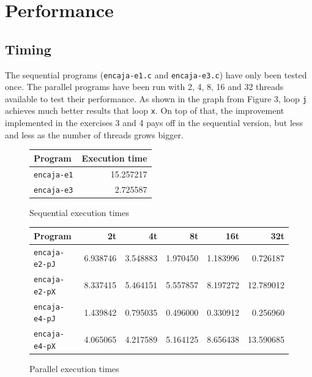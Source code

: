 \documentclass[a4paper]{article}
\begin{document}
\section{Performance}

\subsection{Timing}
The sequential programs (\texttt{encaja-e1.c} and \texttt{encaja-e3.c}) have only been tested once. The parallel programs have been run with 2, 4, 8, 16 and 32 threads available to test their performance. As shown in the graph from Figure 3, loop \texttt{j} achieves much better results that loop \texttt{x}. On top of that, the improvement implemented in the exercises 3 and 4 pays off in the sequential version, but less and less as the number of threads grows bigger.

\begin{figure}[h]
    \centering
    \begin{tabular}{l r}
        Program            & Execution time \\ \hline
        \texttt{encaja-e1} & 15.257217      \\
        \texttt{encaja-e3} &  2.725587      \\
    \end{tabular}
    \caption{Sequential execution times}
\end{figure}
\begin{figure}[h]
    \centering
    \begin{tabular}{l r r r r r}
        Program               & 2t        & 4t        & 8t        & 16t        & 32t        \\ \hline
        \texttt{encaja-e2-pJ} & 6.938746  & 3.548883  & 1.970450  & 1.183996   & 0.726187   \\
        \texttt{encaja-e2-pX} & 8.337415  & 5.464151  & 5.557857  & 8.197272   & 12.789012  \\
        \texttt{encaja-e4-pJ} & 1.439842  & 0.795035  & 0.496000  & 0.330912   & 0.256960   \\
        \texttt{encaja-e4-pX} & 4.065065  & 4.217589  & 5.164125  & 8.656438   & 13.590685  \\
    \end{tabular}
    \caption{Parallel execution times}
\end{figure}
\end{document}
